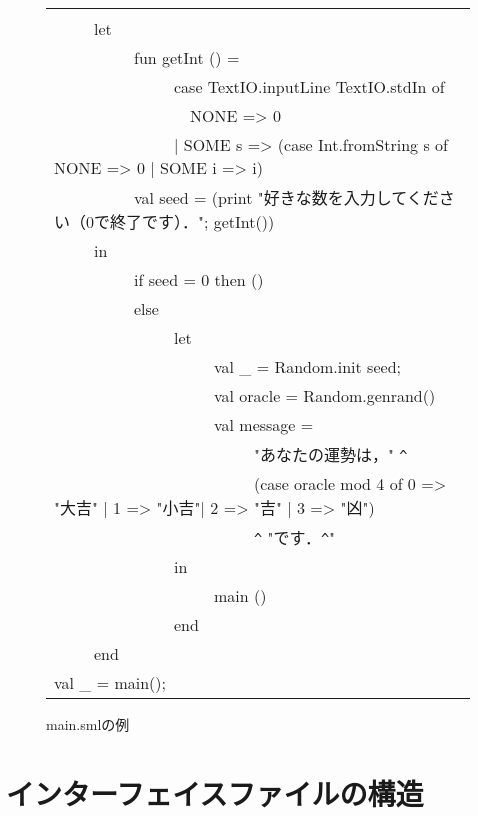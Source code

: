 \documentclass{jbook}
\newenvironment{program}{\begin{tt}\begin{quote}}{\end{quote}\end{tt}}
\newcommand{\myem}{\ \ \ \ \  }
\begin{document}
\begin{figure}[b]
\begin{center}
\begin{tabular}{l}
\begin{minipage}{0.9\textwidth}
\begin{program}
fun main() =\\
\myem  let\\
\myem\myem    fun getInt () = \\
\myem\myem\myem        case TextIO.inputLine TextIO.stdIn of\\
\myem\myem\myem\ \       NONE => 0\\
\myem\myem\myem        | SOME s => (case Int.fromString s of NONE => 0 | SOME i => i)\\
\myem\myem    val seed = (print "好きな数を入力してください（0で終了です）．";  getInt())\\
\myem  in\\
\myem\myem    if seed = 0 then ()\\
\myem\myem    else\\
\myem\myem\myem      let\\
\myem\myem\myem\myem        val \_ = Random.init seed;\\
\myem\myem\myem\myem        val oracle = Random.genrand()\\
\myem\myem\myem\myem        val message = \\
\myem\myem\myem\myem\myem            "あなたの運勢は，" \verb|^|\\
\myem\myem\myem\myem\myem            (case oracle mod 4 of 0 => "大吉" | 1 => "小吉"| 2 => "吉" | 3 => "凶")\\
\myem\myem\myem\myem\myem            \verb|^| "です．\verb|^|"\\
\myem\myem\myem      in\\
\myem\myem\myem\myem        main ()\\
\myem\myem\myem      end\\
\myem  end\\
val \_ = main();
\end{program}
\end{minipage}
\end{tabular}
\caption{main.smlの例}
\label{fig:main}
\end{center}
\end{figure}

	
\section{インターフェイスファイルの構造}
\label{sec:tutorialInterfaceFile}
\end{document}
